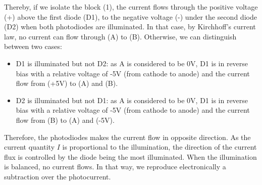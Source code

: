 \documentclass[11pt]{report}
\begin{document}
Thereby, if we isolate the block (1), the current flows through the positive voltage (+) above the first diode (D1), to the negative voltage (-) under the second diode (D2) when both photodiodes are illuminated. In that case, by Kirchhoff's current law, no current can flow through (A) to (B). Otherwise, we can distinguish between two cases:
\begin{itemize}
 \item D1 is illuminated but not D2: as A is considered to be 0V, D1 is in reverse bias with a relative voltage of -5V (from cathode to anode) and the current flow from (+5V) to (A) and (B).
 \item D2 is illuminated but not D1: as A is considered to be 0V, D1 is in reverse bias with a relative voltage of -5V (from cathode to anode) and the current flow from (B) to (A) and (-5V).
\end{itemize}
Therefore, the photodiodes makes the current flow in opposite direction. As the current quantity $I$ is proportional to the illumination, the direction of the current flux is controlled by the diode being the most illuminated. When the illumination is balanced, no current flows. In that way, we reproduce electronically a subtraction over the photocurrent.
\end{document}
